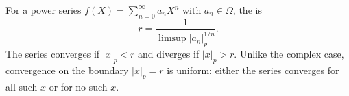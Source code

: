 For a power series $f(X) = \sum_{n=0}^\infty a_n X^n$ with $a_n \in \Omega$, the  is $$r = \frac{1}{\limsup |a_n|_p^{1/n}}.$$ The series converges if $|x|_p < r$ and diverges if $|x|_p > r$. Unlike the complex case, convergence on the boundary $|x|_p = r$ is uniform: either the series converges for all such $x$ or for no such $x$.
